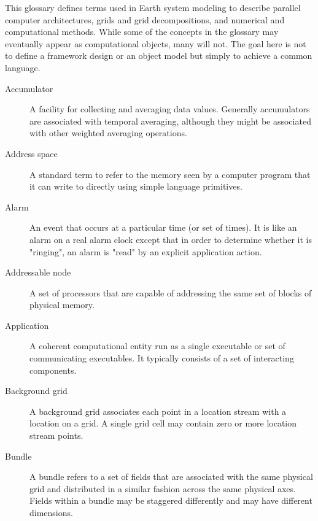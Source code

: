 
This glossary defines terms used in Earth system modeling to describe 
parallel computer architectures, grids and grid decompositions, and 
numerical and computational methods.  While some of the concepts in 
the glossary may eventually appear as computational objects, many 
will not.  The goal here is not to define a framework design or an 
object model but simply to achieve a common language.

\begin{description}

\item[Accumulator] \label{glos:Accumulator} A facility for collecting and 
  averaging data values.  Generally accumulators are associated with 
  temporal averaging, although they might be associated with 
  other weighted averaging operations.    
  
\item[Address space] \label{glos:ASP}A standard term to refer to the memory
  seen by a computer program that it can write to directly using
  simple language primitives. 

\item[Alarm] \label{glos:Alarm} An event 
  that occurs at a particular time (or set of times).  It is like an
   alarm on a real alarm clock except that in order to determine whether 
it is "ringing", an alarm is "read" by an explicit application action.

\item[Addressable node] \label{glos:Anode} A set of processors that are
  capable of addressing the same set of blocks of physical memory.

\item[Application] \label{glos:Application} A coherent computational 
  entity run 
  as a single executable or set of communicating executables.  It 
  typically consists of a set of interacting components.

\item[Background grid] \label{glos:BackGrid} 
  A background grid associates each point in a location stream with a 
  location on a grid. A single grid cell may contain zero or more location 
  stream points.  

\item[Bundle] \label{glos:Bundle} A bundle refers to a set of fields that 
  are associated with the same physical grid and distributed in a similar 
  fashion across the same physical axes.  Fields within a bundle may be
  staggered differently and may have different dimensions.


\end{description}
